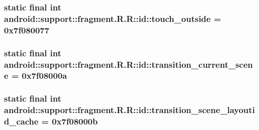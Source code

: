 \hypertarget{classandroid_1_1support_1_1fragment_1_1_r_1_1id_02facacdeefe3db7df2c41f0f3d62ea4}{
\subsubsection[{touch\_\-outside}]{\setlength{\rightskip}{0pt plus 5cm}static final int android::support::fragment.R.R::id::touch\_\-outside = 0x7f080077}}
\label{classandroid_1_1support_1_1fragment_1_1_r_1_1id_02facacdeefe3db7df2c41f0f3d62ea4}


\hypertarget{classandroid_1_1support_1_1fragment_1_1_r_1_1id_38e0d4bd279ff6628010a746a44daee3}{
\subsubsection[{transition\_\-current\_\-scene}]{\setlength{\rightskip}{0pt plus 5cm}static final int android::support::fragment.R.R::id::transition\_\-current\_\-scene = 0x7f08000a}}
\label{classandroid_1_1support_1_1fragment_1_1_r_1_1id_38e0d4bd279ff6628010a746a44daee3}


\hypertarget{classandroid_1_1support_1_1fragment_1_1_r_1_1id_65e5205598ebb9311cca6fe1f1192e1b}{
\subsubsection[{transition\_\-scene\_\-layoutid\_\-cache}]{\setlength{\rightskip}{0pt plus 5cm}static final int android::support::fragment.R.R::id::transition\_\-scene\_\-layoutid\_\-cache = 0x7f08000b}}
\label{classandroid_1_1support_1_1fragment_1_1_r_1_1id_65e5205598ebb9311cca6fe1f1192e1b}


